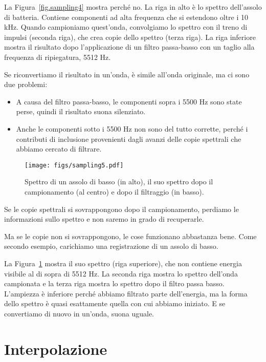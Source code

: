 \documentclass[12pt,a4paper]{book}
\begin{document}
La Figura~\ref{fig.sampling4} mostra perché no. La riga in alto è lo spettro dell'assolo di batteria. Contiene componenti ad alta frequenza che si estendono oltre i 10 kHz. Quando campioniamo quest'onda, convolgiamo lo spettro con il treno di impulsi (seconda riga), che crea copie dello spettro (terza riga). La riga inferiore mostra il risultato dopo l'applicazione di un filtro passa-basso con un taglio alla frequenza di ripiegatura, 5512 Hz.

Se riconvertiamo il risultato in un'onda, è simile all'onda originale, ma ci sono due problemi:

\begin{itemize} 

\item A causa del filtro passa-basso, le componenti sopra i 5500 Hz sono state perse, quindi il risultato suona silenziato.

\item Anche le componenti sotto i 5500 Hz non sono del tutto corrette, perché i contributi di inclusione provenienti dagli avanzi delle copie spettrali che abbiamo cercato di filtrare.

\end{itemize} 

\begin{figure} 

\centerline{\texttt{[image: figs/sampling5.pdf]}} \caption{Spettro di un assolo di basso (in alto), il suo spettro dopo il campionamento (al centro) e dopo il filtraggio (in basso).} \label{fig.sampling5} \end{figure} 

Se le copie spettrali si sovrappongono dopo il campionamento, perdiamo le informazioni sullo spettro e non saremo in grado di recuperarle.

Ma se le copie non si sovrappongono, le cose funzionano abbastanza bene. Come secondo esempio, carichiamo una registrazione di un assolo di basso.

La Figura~\ref{fig.sampling5} mostra il suo spettro (riga superiore), che non contiene energia visibile al di sopra di 5512 Hz. La seconda riga mostra lo spettro dell'onda campionata e la terza riga mostra lo spettro dopo il filtro passa basso. L'ampiezza è inferiore perché abbiamo filtrato parte dell'energia, ma la forma dello spettro è quasi esattamente quella con cui abbiamo iniziato. E se convertiamo di nuovo in un'onda, suona uguale.

\section{Interpolazione} 
\end{document}
